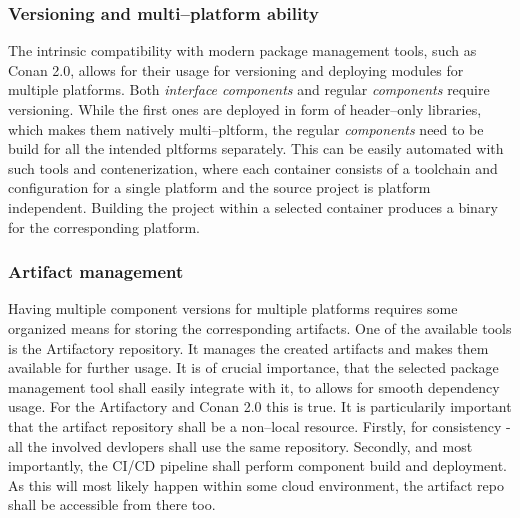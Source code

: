 \documentclass[preprint,12pt, a4paper]{elsarticle}
\begin{document}
\subsubsection{Versioning and multi--platform ability}
The intrinsic compatibility with modern package management tools, such as Conan 2.0, allows for their usage for versioning and deploying modules for multiple platforms. Both \textit{interface components} and regular \textit{components} require versioning. While the first ones are deployed in form of header--only libraries, which makes them natively multi--pltform, the regular \textit{components} need to be build for all the intended pltforms separately. This can be easily automated with such tools and contenerization, where each container consists of a toolchain and configuration for a single platform and the source project is platform independent. Building the project within a selected container produces a binary for the corresponding platform.


\subsubsection{Artifact management}
Having multiple component versions for multiple platforms requires some organized means for storing the corresponding artifacts. One of the available tools is the Artifactory repository. It manages the created artifacts and makes them available for further usage. It is of crucial importance, that the selected package management tool shall easily integrate with it, to allows for smooth dependency usage. For the Artifactory and Conan 2.0 this is true. It is particularily important that the artifact repository shall be a non--local resource. Firstly, for consistency - all the involved devlopers shall use the same repository. Secondly, and most importantly, the CI/CD pipeline shall perform component build and deployment. As this will most likely happen within some cloud environment, the artifact repo shall be accessible from there too.
\end{document}

